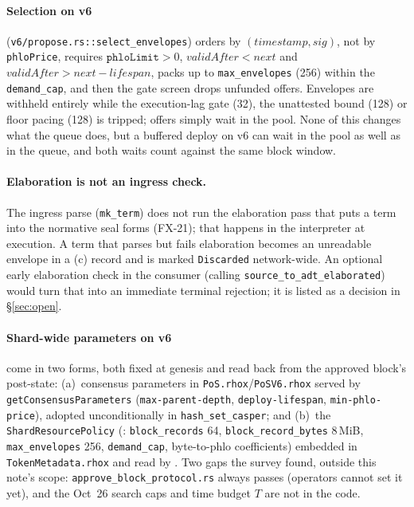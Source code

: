 \documentclass[11pt]{article}
\newcommand{\code}[1]{\texttt{#1}}
\begin{document}
\paragraph{Selection on v6} (\code{v6/propose.rs::select\_envelopes}) orders by
$(\mathit{timestamp}, \mathit{sig})$, not by \code{phloPrice}, requires
$\code{phloLimit} > 0$, $\mathit{validAfter} < \mathit{next}$ and $\mathit{validAfter}
> \mathit{next} - \mathit{lifespan}$, packs up to \code{max\_envelopes} (256) within
the \code{demand\_cap}, and then the gate screen drops unfunded offers. Envelopes are
withheld entirely while the execution-lag gate (32), the unattested bound (128) or
floor pacing (128) is tripped; offers simply wait in the pool. None of this changes
what the queue does, but a buffered deploy on v6 can wait in the pool as well as in
the queue, and both waits count against the same block window.

\paragraph{Elaboration is not an ingress check.} The ingress parse (\code{mk\_term})
does not run the elaboration pass that puts a term into the normative seal forms
(FX-21); that happens in the interpreter at execution. A term that parses but fails
elaboration becomes an unreadable envelope in a (c) record and is marked
\code{Discarded} network-wide. An optional early elaboration check in the consumer
(calling \code{source\_to\_adt\_elaborated}) would turn that into an immediate
terminal rejection; it is listed as a decision in \S\ref{sec:open}.

\paragraph{Shard-wide parameters on v6} come in two forms, both fixed at genesis and
read back from the approved block's post-state: (a)~consensus parameters in
\code{PoS.rhox}/\code{PoSV6.rhox} served by \code{getConsensusParameters}
(\code{max-parent-depth}, \code{deploy-lifespan}, \code{min-phlo-price}), adopted
unconditionally in \code{hash\_set\_casper}; and (b)~the \code{ShardResourcePolicy}
(: \code{block\_records} 64,
\code{block\_record\_bytes} 8\,MiB, \code{max\_envelopes} 256, \code{demand\_cap},
byte-to-phlo coefficients) embedded in \code{TokenMetadata.rhox} and read by
. Two gaps the survey found, outside this note's scope:
\code{approve\_block\_protocol.rs} always passes 
(operators cannot set it yet), and the Oct~26 search caps and time budget $T$ are not
in the code.
\end{document}

